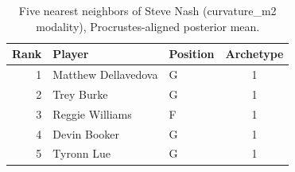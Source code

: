\begin{table}[htbp]
  \centering\small
  \begin{tabular}{rllc}
    \toprule
    Rank & Player & Position & Archetype \\
    \midrule
    1 & Matthew Dellavedova & G & 1 \\
    2 & Trey Burke & G & 1 \\
    3 & Reggie Williams & F & 1 \\
    4 & Devin Booker & G & 1 \\
    5 & Tyronn Lue & G & 1 \\
    \bottomrule
  \end{tabular}
  \caption{Five nearest neighbors of Steve Nash (curvature_m2 modality), Procrustes-aligned posterior mean.}
  \label{tab:Steve_Nash_neighbors_curvature_m2}
\end{table}


